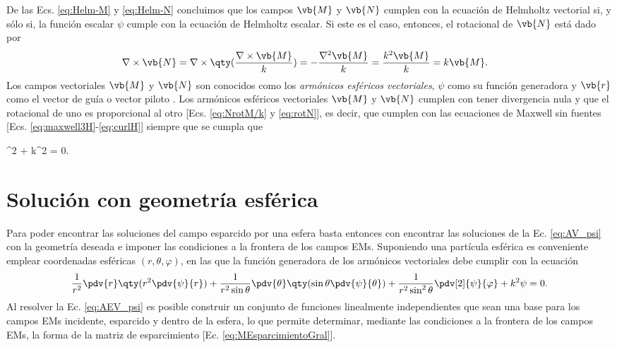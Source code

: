 De las Ecs. \eqref{eq:Helm-M} y \eqref{eq:Helm-N} concluimos que los campos $\vb{M}$ y $\vb{N}$ cumplen con la  ecuación de Helmholtz vectorial si, y sólo si, la función escalar $\psi$ cumple con la ecuación de Helmholtz escalar. Si este es el caso, entonces, el rotacional de $\vb{N}$ está dado por
%
	\begin{align}
	\nabla\times \vb{N} &= \nabla\times \qty(\frac{\nabla\times \vb{M}}{k})  
						= - \frac{\nabla^2 \vb{M}}{k}
						= \frac{k^2 \vb{M}}{k}
						= k \vb{M}.\label{eq:rotN}
	\end{align}\noindent
%
Los campos vectoriales $\vb{M}$ y $\vb{N}$ son conocidos como los \emph{armónicos esféricos vectoriales}, $\psi$ como su función generadora y $\vb{r}$ como el vector de guía o vector piloto \cite{bohren1998absorption}. Los armónicos esféricos vectoriales $\vb{M}$ y $\vb{N}$  cumplen con tener divergencia nula y que el rotacional de uno es proporcional al otro [Ecs. \eqref{eq:NrotM/k} y \eqref{eq:rotN}], es decir, que cumplen con las ecuaciones de Maxwell sin fuentes [Ecs. \eqref{eq:maxwell3H}-\eqref{eq:curlH}] siempre que se cumpla que
%
	\begin{tcolorbox}[title = $\mathbf{\psi}$: Función generadora de los armónicos esféricos vectoriales, ams align ]
	\nabla^2 \psi + k^2 \psi  = 0.\label{eq:AV_psi}
	\end{tcolorbox}
%
\section{Solución con geometría esférica}

Para poder encontrar las soluciones del campo esparcido por una esfera basta entonces con encontrar las soluciones de la Ec. \eqref{eq:AV_psi} con la geometría deseada e imponer las condiciones a la frontera de los campos EMs. Suponiendo una partícula esférica es conveniente emplear coordenadas esféricas $(r, \theta, \varphi)$, en las que la función generadora de los armónicos vectoriales debe cumplir con la ecuación 
%
	\begin{align}
	\frac{1}{r^2} \pdv{r}\qty(r^2\pdv{\psi}{r})+ 
	\frac{1}{r^2\sin\theta}\pdv{\theta}\qty(\sin\theta\pdv{\psi}{\theta})
	 + \frac{1}{r^2\sin^2\theta}\pdv[2]{\psi}{\varphi} + k^2 \psi =0. \label{eq:AEV_psi}
	\end{align}
%	
Al resolver la Ec. \eqref{eq:AEV_psi} es posible construir un conjunto de funciones linealmente independientes que sean una base para los campos EMs incidente, esparcido y dentro de la esfera, lo que permite determinar, mediante las condiciones a la frontera de los campos EMs, la forma de la matriz de esparcimiento [Ec. \eqref{eq:MEsparcimientoGral}].
	
